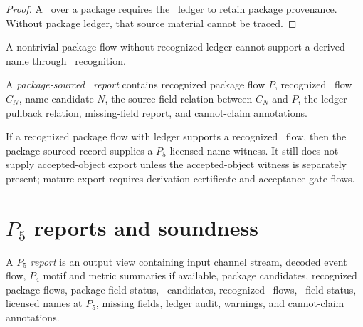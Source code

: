 \begin{proof}
A \NameCert\ over a package requires the \NameCert\ ledger to retain package provenance. Without package ledger, that source material cannot be traced.
\end{proof}

\begin{corollary}
\label{cor:pkg-namecert-package-without-ledger-no-namecert}
A nontrivial package flow without recognized ledger cannot support a derived name through \NameCert\ recognition.
\end{corollary}

\begin{definition}
\label{def:pkg-namecert-package-sourced-report}
A \emph{package-sourced \NameCert\ report} contains recognized package flow $P$, recognized \NameCert\ flow $C_N$, name candidate $N$, the source-field relation between $C_N$ and $P$, the ledger-pullback relation, missing-field report, and cannot-claim annotations.
\end{definition}

\begin{principle}
\label{prin:pkg-namecert-over-package-not-export}
If a recognized package flow with ledger supports a recognized \NameCert\ flow, then the package-sourced record supplies a $P_5$ licensed-name witness. It still does not supply accepted-object export unless the accepted-object witness is separately present; mature export requires derivation-certificate and acceptance-gate flows.
\end{principle}

\section{$P_5$ reports and soundness}
\label{sec:pkg-namecert-reports-soundness}

\begin{definition}[$P_5$ report]
\label{def:pkg-namecert-p5-report}
A \emph{$P_5$ report} is an output view containing input channel stream, decoded event flow, $P_4$ motif and metric summaries if available, package candidates, recognized package flows, package field status, \NameCert\ candidates, recognized \NameCert\ flows, \NameCert\ field status, licensed names at $P_5$, missing fields, ledger audit, warnings, and cannot-claim annotations.
\end{definition}

